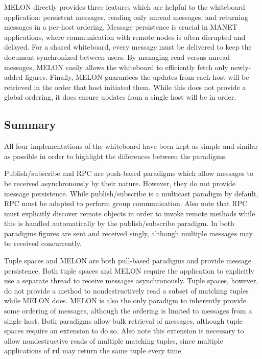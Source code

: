 \documentclass{llncs}
\begin{document}
MELON directly provides three features which are helpful to the whiteboard application: persistent messages, reading only unread messages, and returning messages in a per-host ordering. Message persistence is crucial in MANET applications, where communication with remote nodes is often disrupted and delayed. For a shared whiteboard, every message must be delivered to keep the document synchronized between users. By managing read versus unread messages, MELON easily allows the whiteboard to efficiently fetch only newly-added figures. Finally, MELON guarantees the updates from each host will be retrieved in the order that host initiated them. While this does not provide a global ordering, it does ensure updates from a single host will be in order.

\subsection{Summary}

All four implementations of the whiteboard have been kept as simple and similar as possible in order to highlight the differences between the paradigms.

Publish/subscribe and RPC are push-based paradigms which allow messages to be received asynchronously by their nature. However, they do not provide message persistence. While publish/subscribe is a multicast paradigm by default, RPC must be adapted to perform group communication. Also note that RPC must explicitly discover remote objects in order to invoke remote methods while this is handled automatically by the publish/subscribe paradigm. In both paradigms figures are sent and received singly, although multiple messages may be received concurrently.

Tuple spaces and MELON are both pull-based paradigms and provide message persistence. Both tuple spaces and MELON require the application to explicitly use a separate thread to receive messages asynchronously. Tuple spaces, however, do not provide a method to nondestructively read a subset of matching tuples while MELON does. MELON is also the only paradigm to inherently provide some ordering of messages, although the ordering is limited to messages from a single host. Both paradigms allow bulk retrieval of messages, although tuple spaces require an extension to do so. Also note this extension is necessary to allow nondestructive reads of multiple matching tuples, since multiple applications of \textbf{rd} may return the same tuple every time.
\end{document}

